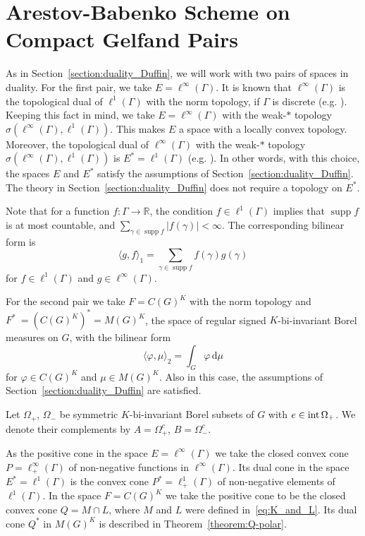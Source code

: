 \documentclass[[a4paper,english,12pt]{amsart}
\theoremstyle{plain}
\theoremstyle{remark}
\newcommand\supp{\operatorname{supp}}
\newcommand{\intt}{\mbox{\rm int\,}}
\begin{document}

\section{Arestov-Babenko Scheme on Compact Gelfand Pairs} \label{section:A-B_scheme}

As in Section~\ref{section:duality_Duffin}, we will work with two pairs of spaces in duality. For the first pair, we take $E = \ell^\infty(\Gamma)$.  It is known that  $\ell^\infty(\Gamma)$ is the topological dual of  $\ell^1(\Gamma)$ with the norm topology, if $\Gamma$ is discrete (e.g. \cite[Theorem  4.2.1]{edwards}). Keeping this fact in mind, we take $E = \ell^\infty(\Gamma)$ with the weak-$\ast$ topology $\sigma(\ell^\infty(\Gamma), \ell^1(\Gamma))$. This makes $E$ a space with a locally convex topology.  Moreover, the topological dual of $\ell^\infty(\Gamma)$ with the weak-$\ast$ topology $\sigma(\ell^\infty(\Gamma),   \ell^1(\Gamma))$ is $E^* = \ell^1(\Gamma)$ (e.g. \cite[Proposition 3.14]{Brezis}). In other words, with this choice, the spaces $E$ and $E^*$ satisfy the assumptions of Section~\ref{section:duality_Duffin}. The theory in Section~\ref{section:duality_Duffin} does not require a topology on $E^*$.

Note that for a function $f : \Gamma \to \mathbb{R}$, the condition $f \in \ell^1(\Gamma)$ implies that $\supp{f}$ is at most countable, and $\sum_{\gamma \in \supp{f}} |f(\gamma)| < \infty$.
The corresponding bilinear form is
$$
\langle g,f \rangle_1 = \sum_{\gamma \in \supp{f}} f(\gamma) g(\gamma)
$$
for  $f \in \ell^1(\Gamma)$ and $g \in \ell^\infty(\Gamma)$.  

For the second pair we take $F = C(G)^{K}$ with the norm topology and $F^*~= (C(G)^{K})^* = M(G)^{K}$, the space of regular signed $K$-bi-invariant Borel measures on $G$, with the bilinear form
$$
\langle \varphi, \mu \rangle_2 = \int_{G} \varphi \, \mbox{d}\mu
$$
for  $\varphi \in C(G)^{K}$ and $\mu \in M(G)^K$. Also in this case, the assumptions of Section~\ref{section:duality_Duffin} are satisfied.

Let $\Omega_+$, $\Omega_-$ be symmetric $K$-bi-invariant Borel subsets of $G$ with $e \in \intt{\Omega_+}$. We denote their complements by $A = \Omega_+^c$, $B = \Omega_-^c$.


As the positive cone in the space $E = \ell^\infty(\Gamma)$ we take the closed convex cone $P = \ell^\infty_+(\Gamma)$ of non-negative functions in $\ell^\infty(\Gamma)$. Its dual cone in the space $E^* = \ell^1(\Gamma)$ is the convex cone  $P^* = \ell^1_+(\Gamma)$ of non-negative elements of $\ell^1(\Gamma)$. In the space $F = C(G)^K$ we take the positive cone to be the closed convex cone $Q  = M \cap L$, where $M$ and $L$ were defined in~\eqref{eq:K_and_L}. Its dual cone $Q^*$ in $M(G)^K$ is described in Theorem~\ref{theorem:Q-polar}.
\end{document}
